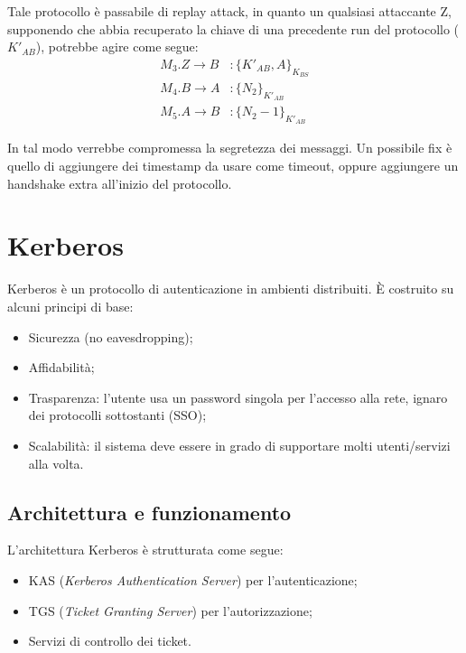 \documentclass[a4paper, 10pt, twoside]{article}
\begin{document}
	Tale protocollo è passabile di replay attack, in quanto un qualsiasi attaccante Z, supponendo che abbia recuperato la chiave di una precedente run del protocollo ($K'_{AB}$), potrebbe agire come segue:
	\begin{align*}
		M_3. Z \to B&: \lbrace K'_{AB}, A\rbrace_{K_{BS}} \\
		M_4. B \to A&: \lbrace N_2\rbrace_{K'_{AB}}\\
		M_5. A \to B&: \lbrace N_2-1\rbrace_{K'_{AB}}
	\end{align*}
	
	In tal modo verrebbe compromessa la segretezza dei messaggi. Un possibile fix è quello di aggiungere dei timestamp da usare come timeout, oppure aggiungere un handshake extra all'inizio del protocollo.
	
	\section{Kerberos}
	Kerberos è un protocollo di autenticazione in ambienti distribuiti. È costruito su alcuni principi di base: \begin{itemize}
		\item Sicurezza (no eavesdropping);
		\item Affidabilità;
		\item Trasparenza: l'utente usa un password singola per l'accesso alla rete, ignaro dei protocolli sottostanti (SSO);
		\item Scalabilità: il sistema deve essere in grado di supportare molti utenti/servizi alla volta.
	\end{itemize}
	
	\subsection{Architettura e funzionamento}
	L'architettura Kerberos è strutturata come segue: \begin{itemize}
		\item KAS (\textit{Kerberos Authentication Server}) per l'autenticazione;
		\item TGS (\textit{Ticket Granting Server}) per l'autorizzazione;
		\item Servizi di controllo dei ticket.
	\end{itemize}
	
\end{document}
